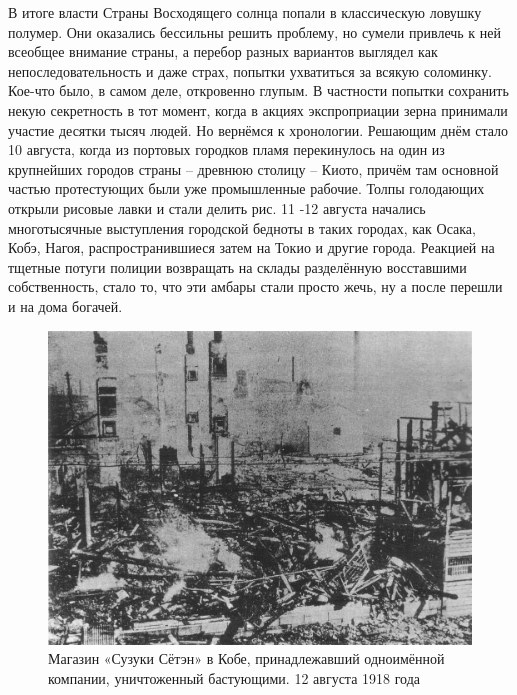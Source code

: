 В итоге власти Страны Восходящего солнца попали в классическую ловушку полумер. Они оказались бессильны решить проблему, но сумели привлечь к ней всеобщее внимание страны, а перебор разных вариантов выглядел как непоследовательность и даже страх, попытки ухватиться за всякую соломинку. Кое-что было, в самом деле, откровенно глупым. В частности попытки сохранить некую секретность в тот момент, когда в акциях экспроприации зерна принимали участие десятки тысяч людей. Но вернёмся к хронологии. Решающим днём стало 10 августа, когда из портовых городков пламя перекинулось на один из крупнейших городов страны – древнюю столицу – Киото, причём там основной частью протестующих были уже промышленные рабочие. Толпы голодающих открыли рисовые лавки и стали делить рис. 11 -12 августа начались многотысячные выступления городской бедноты в таких городах, как Осака, Кобэ, Нагоя, распространившиеся затем на Токио и другие города. Реакцией на тщетные потуги полиции возвращать на склады разделённую восставшими собственность, стало то, что эти амбары стали просто жечь, ну а после перешли и на дома богачей. 

\begin{figure}[h!tb] 
	\centering\includegraphics[scale=0.4]{Glava5/L0rhzLzA5u4.jpg}
	\caption{Магазин «Сузуки Сётэн» в Кобе, принадлежавший одноимённой компании, уничтоженный бастующими. 12 августа 1918 года}%
\end{figure}

